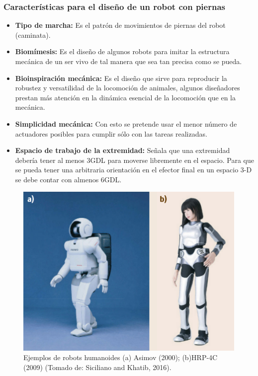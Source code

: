 			\subsubsection*{Características para el diseño de un robot con piernas}
\begin{itemize}
\item \textbf{Tipo de marcha:} Es el patrón de movimientos de piernas del robot (caminata).

\item \textbf{Biomímesis:} Es el diseño de algunos robots para imitar la estructura mecánica de un ser vivo de tal manera que sea tan precisa como se pueda.

\item \textbf{Bioinspiración mecánica:} Es el diseño que sirve para reproducir la robustez y versatilidad de la locomoción de animales, algunos diseñadores prestan más atención en la dinámica esencial de la locomoción que en la mecánica.

\item \textbf{Simplicidad mecánica:} Con esto se pretende usar el menor número de actuadores posibles para cumplir sólo con las tareas realizadas.

\item \textbf{Espacio de trabajo de la extremidad: } Señala que una extremidad debería tener al menos 3GDL para moverse libremente en el espacio. Para que se pueda tener una arbitraria orientación en el efector final en un espacio 3-D se debe contar con almenos 6GDL.

\end{itemize}

\begin{figure}
	\centering		
	\includegraphics[scale=0.5]{images/asimov_and_HRP-4C.png}
	\caption{Ejemplos de robots humanoides (a) Asimov (2000); (b)HRP-4C (2009) (Tomado de: Siciliano and Khatib, 2016).}		
\label{fig:humanoids}%
\end{figure}


